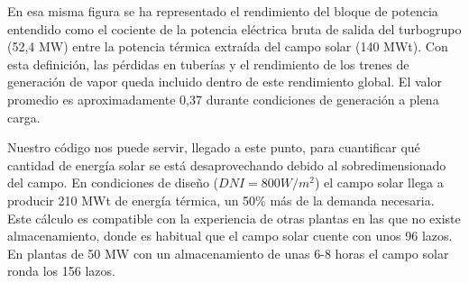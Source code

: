 En esa misma figura se ha representado el rendimiento del bloque de potencia entendido como el cociente de la potencia eléctrica bruta de salida del turbogrupo (52,4 MW) entre la potencia térmica extraída del campo solar (140 MWt). Con esta definición, las pérdidas en tuberías y el rendimiento de los trenes de generación de vapor queda incluido dentro de este rendimiento global.  El valor promedio es aproximadamente 0,37 durante condiciones de generación a plena carga.

Nuestro código nos puede servir, llegado a este punto, para cuantificar qué cantidad de energía solar se está desaprovechando debido al sobredimensionado del campo. En condiciones de diseño ($DNI=800 W/m^2$) el campo solar llega a producir 210 MWt de energía térmica, un 50\% más de la demanda necesaria. Este cálculo es compatible con la experiencia de otras plantas en las que no existe almacenamiento, donde es habitual que el campo solar cuente con unos 96 lazos. En plantas de 50 MW con un almacenamiento de unas 6-8 horas el campo solar ronda los 156 lazos.


